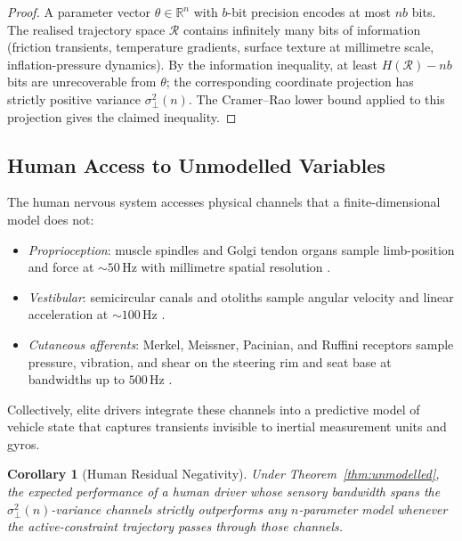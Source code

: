 \documentclass[11pt,twocolumn]{article}
\newtheorem{corollary}[theorem]{Corollary}
\theoremstyle{definition}
\theoremstyle{remark}
\newcommand{\R}{\mathbb{R}}
\newcommand{\cR}{\mathcal{R}}
\begin{document}
\begin{proof}
A parameter vector $\theta \in \R^n$ with $b$-bit precision encodes at most $nb$ bits. The realised trajectory space $\cR$ contains infinitely many bits of information (friction transients, temperature gradients, surface texture at millimetre scale, inflation-pressure dynamics). By the information inequality, at least $H(\cR) - nb$ bits are unrecoverable from $\theta$; the corresponding coordinate projection has strictly positive variance $\sigma^2_{\perp}(n)$. The Cramer--Rao lower bound \cite{kay1993fundamentals,cramer1946mathematical} applied to this projection gives the claimed inequality.
\end{proof}

\subsection{Human Access to Unmodelled Variables}

The human nervous system accesses physical channels that a finite-dimensional model does not:

\begin{itemize}[leftmargin=*,itemsep=2pt]
\item \emph{Proprioception}: muscle spindles and Golgi tendon organs sample limb-position and force at $\sim 50\,\mathrm{Hz}$ with millimetre spatial resolution \cite{kandel2013principles,shadmehr2005biology,enoka2015neuromechanics}.
\item \emph{Vestibular}: semicircular canals and otoliths sample angular velocity and linear acceleration at $\sim 100\,\mathrm{Hz}$ \cite{kandel2013principles}.
\item \emph{Cutaneous afferents}: Merkel, Meissner, Pacinian, and Ruffini receptors sample pressure, vibration, and shear on the steering rim and seat base at bandwidths up to $500\,\mathrm{Hz}$ \cite{kandel2013principles,enoka2015neuromechanics}.
\end{itemize}

\noindent Collectively, elite drivers integrate these channels into a predictive model of vehicle state that captures transients invisible to inertial measurement units and gyros.

\begin{corollary}[Human Residual Negativity]\label{cor:human-residual}
Under Theorem~\ref{thm:unmodelled}, the expected performance of a human driver whose sensory bandwidth spans the $\sigma^2_{\perp}(n)$-variance channels strictly outperforms any $n$-parameter model whenever the active-constraint trajectory passes through those channels.
\end{corollary}
\end{document}
